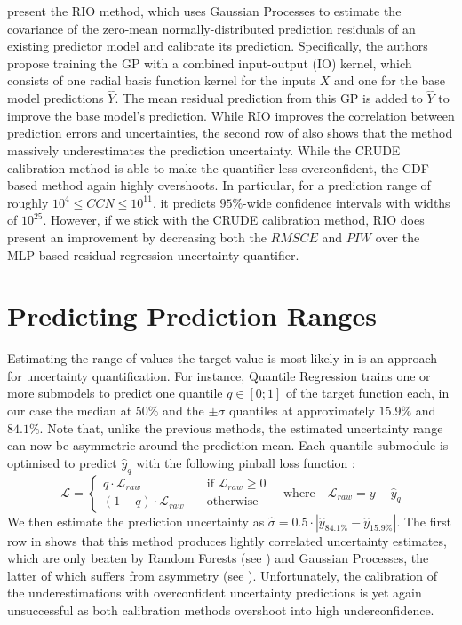 \noindent \textcite{rio-2019} present the RIO method, which uses Gaussian Processes to estimate the covariance of the zero-mean normally-distributed prediction residuals of an existing predictor model and calibrate its prediction. Specifically, the authors propose training the GP with a combined input-output (IO) kernel, which consists of one radial basis function kernel for the inputs $X$ and one for the base model predictions $\hat{Y}$. The mean residual prediction from this GP is added to $\hat{Y}$ to improve the base model's prediction. While RIO improves the correlation between prediction errors and uncertainties, the second row of  also shows that the method massively underestimates the prediction uncertainty. While the CRUDE calibration method is able to make the quantifier less overconfident, the CDF-based method again highly overshoots. In particular, for a prediction range of roughly $10^{4} \leq CCN \leq 10^{11}$, it predicts $95\%$-wide confidence intervals with widths of $10^{25}$. However, if we stick with the CRUDE calibration method, RIO does present an improvement by decreasing both the $RMSCE$ and $PIW$ over the MLP-based residual regression uncertainty quantifier.

\section{Predicting Prediction Ranges} \label{txt:uncertainty-predict-range}

Estimating the range of values the target value is most likely in is an approach for uncertainty quantification. For instance, Quantile Regression trains one or more submodels to predict one quantile $q \in [0; 1]$ of the target function each, in our case the median at $50\%$ and the $\pm \sigma$ quantiles at approximately $15.9\%$ and $84.1\%$. Note that, unlike the previous methods, the estimated uncertainty range can now be asymmetric around the prediction mean. Each quantile submodule is optimised to predict $\hat{y}_{q}$ with the following pinball loss function \cite{regression-quantiles-1978, deep-quantiles-2022}:
\begin{equation*}
    \mathcal{L} = \begin{cases}
        q \cdot \mathcal{L}_{raw} \quad &\text{if } \mathcal{L}_{raw} \geq 0 \\
        (1-q) \cdot \mathcal{L}_{raw} \quad &\text{otherwise}
    \end{cases} \quad \text{where} \quad \mathcal{L}_{raw} = y - \hat{y}_{q}
\end{equation*}
We then estimate the prediction uncertainty as $\hat{\sigma} = 0.5 \cdot |\hat{y}_{84.1\%} - \hat{y}_{15.9\%}|$. The first row in  shows that this method produces lightly correlated uncertainty estimates, which are only beaten by Random Forests (see ) and Gaussian Processes, the latter of which suffers from asymmetry (see ). Unfortunately, the calibration of the underestimations with overconfident uncertainty predictions is yet again unsuccessful as both calibration methods overshoot into high underconfidence.

